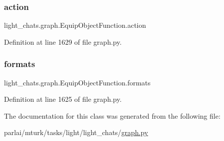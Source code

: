 \subsubsection{\texorpdfstring{action}{action}}
{\footnotesize\ttfamily light\+\_\+chats.\+graph.\+Equip\+Object\+Function.\+action}



Definition at line 1629 of file graph.\+py.

\mbox{\label{classlight__chats_1_1graph_1_1EquipObjectFunction_a798cbf33f30601ca3ac770b472ddbe6c}} 
\subsubsection{\texorpdfstring{formats}{formats}}
{\footnotesize\ttfamily light\+\_\+chats.\+graph.\+Equip\+Object\+Function.\+formats}



Definition at line 1625 of file graph.\+py.



The documentation for this class was generated from the following file\+:\begin{DoxyCompactItemize}
\item 
parlai/mturk/tasks/light/light\+\_\+chats/\hyperlink{parlai_2mturk_2tasks_2light_2light__chats_2graph_8py}{graph.\+py}\end{DoxyCompactItemize}
